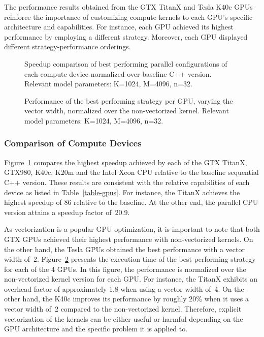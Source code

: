 The performance results obtained from the GTX TitanX and Tesla K40c GPUs
reinforce the importance of customizing compute kernels to each GPU's specific
architecture and capabilities. For instance, each GPU achieved its highest
performance by employing a different strategy. Moreover, each GPU displayed
different strategy-performance orderings.

\begin{figure}[b]	%
  \centering
  \caption{Speedup comparison of best performing parallel configurations of
  each compute device normalized over baseline C++ version. Relevant model
  parameters: K=1024, M=4096, n=32.}
  \label{gpus-fig}
\end{figure}

\begin{figure}[b]	%
  \centering
  \caption{Performance of the best performing strategy per GPU, varying the
  vector width, normalized over the non-vectorized kernel. Relevant model
  parameters: K=1024, M=4096, n=32.}
  \label{gpus-v-sweep}
\end{figure}

\subsubsection{Comparison of Compute Devices}
Figure~\ref{gpus-fig} compares the highest speedup achieved by each of the
GTX TitanX, GTX980, K40c, K20m and the Intel Xeon CPU relative to the baseline
sequential C++ version. These results are consistent with the relative
capabilities of each device as listed in Table~\ref{table-gpus}. For instance,
the TitanX achieves the highest speedup of 86 relative to the baseline. At the
other end, the parallel CPU version attains a speedup factor of~20.9.

As vectorization is a popular GPU optimization, it is important to note that
both GTX GPUs achieved their highest performance with non-vectorized kernels.
On the other hand, the Tesla GPUs obtained the best performance with a vector
width of~2. Figure~\ref{gpus-v-sweep} presents the execution time of the best
performing strategy for each of the 4 GPUs. In this figure, the performance is
normalized over the non-vectorized kernel version for each GPU. For instance,
the TitanX exhibits an overhead factor of approximately 1.8 when using a vector
width of~4. On the other hand, the K40c improves its performance by roughly
20\% when it uses a vector width of~2 compared to the non-vectorized kernel.
Therefore, explicit vectorization of the kernels can be either useful or
harmful depending on the GPU architecture and the specific problem it is
applied to.



